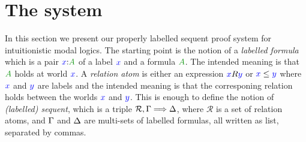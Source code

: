 \documentclass[a4paper]{article}
\theoremstyle{plain}
\theoremstyle{definition}
\newcommand{\B}{\mathcal{R}}
\newcommand{\lseq}[3]{#1 , #2 \SEQ #3}
\newcommand*{\fm}[1]{{\color{notgreen}{#1}}}
\newcommand*{\lb}[1]{{\color{blue}{#1}}}
\newcommand*{\labels}[2]{\lb{#1}\mathord{:}\fm{#2}}
\newcommand*{\accs}[2]{\lb{#1}R\lb{#2}}
\newcommand*{\futs}[2]{\lb{#1}\le{\color{blue}{#2}}}
\newcommand{\SEQ}{\Longrightarrow}
\begin{document}
\section{The system}\label{sec:system}

In this section we present our properly labelled sequent proof system
for intuitionistic modal logics. The starting point is the notion of a
\emph{labelled formula} which is a pair $\labels xA$ of a label $\lb
x$ and a formula $\fm A$. The intended meaning is that $\fm A$ holds
at world $\lb x$. A \emph{relation atom} is either an expression
$\accs xy$ or $\futs xy$ where $\lb x$ and $\lb y$ are labels and the
intended meaning is that the corresponing relation holds between the
worlds $\lb x$ and $\lb y$. This is enough to define the notion of
\emph{(labelled) sequent}, which is a triple $\lseq\B\Left\Right$,
where $\B$ is a set of relation atoms, and $\Gamma$ and $\Delta$ are
multi-sets of labelled formulas, all written as list, separated by commas.
\end{document}
